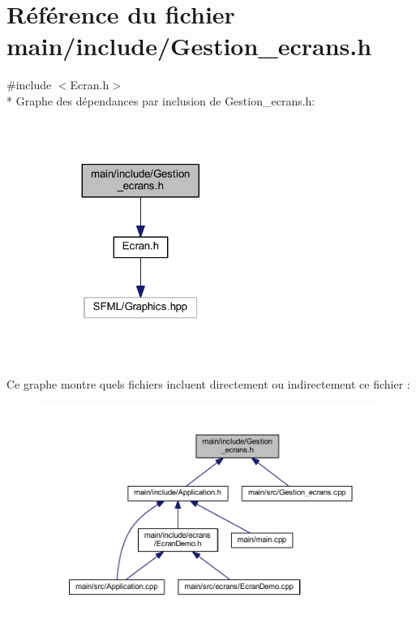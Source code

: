 \section{Référence du fichier main/include/\+Gestion\+\_\+ecrans.h}
\label{_gestion__ecrans_8h}
{\ttfamily \#include $<$Ecran.\+h$>$}\\*
Graphe des dépendances par inclusion de Gestion\+\_\+ecrans.\+h\+:\nopagebreak
\begin{figure}[H]
\begin{center}
\leavevmode
\includegraphics[width=188pt]{_gestion__ecrans_8h__incl}
\end{center}
\end{figure}
Ce graphe montre quels fichiers incluent directement ou indirectement ce fichier \+:\nopagebreak
\begin{figure}[H]
\begin{center}
\leavevmode
\includegraphics[width=350pt]{_gestion__ecrans_8h__dep__incl}
\end{center}
\end{figure}
